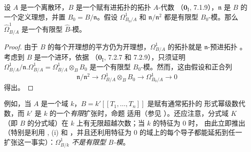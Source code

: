 \begin{proposition}[20.7.15]
\label{0.20.7.15-fr}
设 $A$ 是一个离散环，$B$ 是一个赋有进拓扑的拓扑 $A$-代数
（$\mathbf{0}_{\mathrm I}$, 7.1.9），$\mathfrak{n}$ 是 $B$ 的一个定义理想，并置
$B_0=B/\mathfrak{n}$。假设 $\Omega^1_{B_0/A}$ 和
$\mathfrak{n}/\mathfrak{n}^2$ 都是有限型 $B_0$-模。那么
$\widehat{\Omega}^1_{B/A}$ 是一个有限型 $\widehat B$-模。
\end{proposition}

\begin{proof}
由于 $B$ 的每个开理想的平方仍为开理想，$\Omega^1_{B/A}$ 的拓扑就是
$\mathfrak{n}$-预进拓扑 。考虑到 $B$ 是一个进环，依据
（$\mathbf{0}_{\mathrm I}$, 7.2.7 和 7.2.9），只须证明
$\Omega^1_{B/A}/\mathfrak{n}.\Omega^1_{B/A}=
\Omega^1_{B/A}\otimes_B B_0$ 是一个有限型 $B_0$-模。然而，这由假设和正合列
\[
  \mathfrak{n}/\mathfrak{n}^2\to
  \Omega^1_{B/A}\otimes_B B_0\to\Omega^1_{B_0/A}\to0
\]
得出。
\end{proof}

\begin{env}[20.7.16]
\label{0.20.7.16-fr}
例如，当 $A$ 是一个域 $k$，$B=k'[[T_1,\ldots,T_n]]$ 是赋有通常拓扑的
形式幂级数代数，而 $k'$ 是 $k$ 的一个\emph{有限}扩张时，命题
 适用（参见 ）。还应注意，分式域
$K$（即 $B$ 的分式域）在 $k$ 上有无限超越次数；当 $k$ 的特征为 $0$ 时，
由此立即推出（特别是利用 , (i) 和
，并且还利用特征为 $0$ 的域上的每个导子都能延拓到任一
扩张这一事实）：$\Omega^1_{B/k}$ \emph{不是有限型 $B$-模}。
\end{env}

